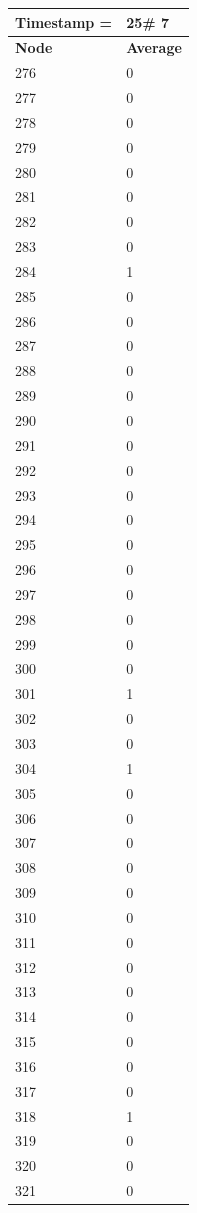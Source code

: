 \begin{tabular}{|l||l|}
\hline
\textbf{Timestamp =} & \textbf{25}\# 7\\\hline
	\textbf{Node} & \textbf{Average} \\ \hline
\hline
	276 & 0 \\ \hline
	277 & 0 \\ \hline
	278 & 0 \\ \hline
	279 & 0 \\ \hline
	280 & 0 \\ \hline
	281 & 0 \\ \hline
	282 & 0 \\ \hline
	283 & 0 \\ \hline
	284 & 1 \\ \hline
	285 & 0 \\ \hline
	286 & 0 \\ \hline
	287 & 0 \\ \hline
	288 & 0 \\ \hline
	289 & 0 \\ \hline
	290 & 0 \\ \hline
	291 & 0 \\ \hline
	292 & 0 \\ \hline
	293 & 0 \\ \hline
	294 & 0 \\ \hline
	295 & 0 \\ \hline
	296 & 0 \\ \hline
	297 & 0 \\ \hline
	298 & 0 \\ \hline
	299 & 0 \\ \hline
	300 & 0 \\ \hline
	301 & 1 \\ \hline
	302 & 0 \\ \hline
	303 & 0 \\ \hline
	304 & 1 \\ \hline
	305 & 0 \\ \hline
	306 & 0 \\ \hline
	307 & 0 \\ \hline
	308 & 0 \\ \hline
	309 & 0 \\ \hline
	310 & 0 \\ \hline
	311 & 0 \\ \hline
	312 & 0 \\ \hline
	313 & 0 \\ \hline
	314 & 0 \\ \hline
	315 & 0 \\ \hline
	316 & 0 \\ \hline
	317 & 0 \\ \hline
	318 & 1 \\ \hline
	319 & 0 \\ \hline
	320 & 0 \\ \hline
	321 & 0 \\ \hline
\end{tabular}
